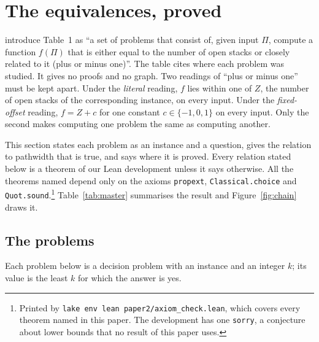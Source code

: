 \section{The equivalences, proved}
\label{sec:equiv}

\citet[p.~1764]{LY2002} introduce Table~1 as ``a set of problems that consist
of, given input $\Pi$, compute a function $f(\Pi)$ that is either equal to the
number of open stacks or closely related to it (plus or minus one)''. The table
cites where each problem was studied. It gives no proofs and no graph. Two
readings of ``plus or minus one'' must be kept apart. Under the \emph{literal}
reading, $f$ lies within one of $Z$, the number of open stacks of the
corresponding instance, on every input. Under the \emph{fixed-offset} reading,
$f = Z + c$ for one constant $c\in\{-1,0,1\}$ on every input. Only the second
makes computing one problem the same as computing another.

This section states each problem as an instance and a question, gives the
relation to pathwidth that is true, and says where it is proved. Every relation
stated below is a theorem of our Lean development unless it says otherwise. All
the theorems named depend only on the axioms \texttt{propext},
\texttt{Classical.choice} and \texttt{Quot.sound}.\footnote{Printed by
\texttt{lake env lean paper2/axiom\_check.lean}, which covers every theorem
named in this paper. The development has one
\texttt{sorry}, a conjecture about lower bounds that no result of this paper
uses.} Table~\ref{tab:master} summarises the result and
Figure~\ref{fig:chain} draws it.

\subsection{The problems}
\label{sec:problems}

Each problem below is a decision problem with an instance and an integer $k$;
its value is the least $k$ for which the answer is yes.

